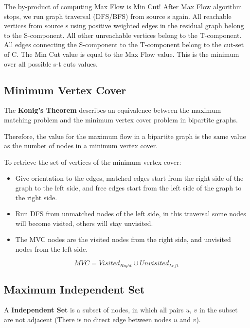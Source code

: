 The by-product of computing Max Flow is Min Cut! After Max Flow algorithm stops, we run graph traversal (DFS/BFS)
from source s again. All reachable vertices from source s using positive weighted edges in the residual graph belong
to the S-component. All other unreachable vertices belong to the T-component. All edges connecting the S-component to
the T-component belong to the cut-set of C. The Min Cut value is equal to the Max Flow value.
This is the minimum over all possible s-t cuts values.

\subsection{Minimum Vertex Cover}

\vspace{12 pt}

	The \textbf{Konig's Theorem} describes an equivalence between the maximum matching
	problem and the minimum vertex cover problem in bipartite graphs.

	Therefore, the value for the maximum flow in a bipartite graph is the same value as the number of nodes in a minimum vertex cover.

	To retrieve the set of vertices of the minimum vertex cover:
	\begin{itemize}
		\item Give orientation to the edges, matched edges start from the right side of the graph to the left side, and free edges start from the left side of the graph to the right side.
		
		\item Run DFS from unmatched nodes of the left side, in this traversal some nodes will become visited, others will stay unvisited.
		
		\item The MVC nodes are the visited nodes from the right side, and unvisited nodes from the left side.
	\end{itemize}

	$$ MVC = Visited_{Right} \cup Unvisited_{Left} $$


	\subsection{Maximum Independent Set}

		A \textbf{Independent Set} is a subset of nodes, in which all pairs {$u$, $v$} in the subset are not adjacent (There is no direct edge between nodes $u$ and $v$).
		
